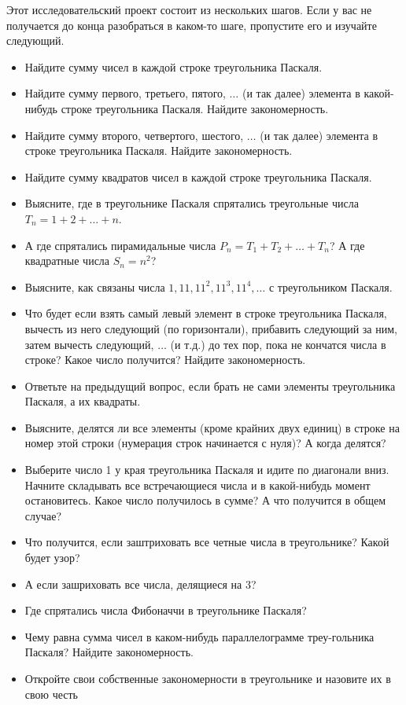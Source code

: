 ﻿

Этот исследовательский проект состоит из нескольких шагов. Если у вас не получается до конца разобраться в каком-то шаге, пропустите его и изучайте следующий.

\begin{itemize}
\item Найдите сумму чисел в каждой строке треугольника Паскаля.
\item Найдите сумму первого, третьего, пятого, $\ldots$ (и так далее) элемента в какой-нибудь строке треугольника Паскаля. Найдите закономерность.
\item Найдите сумму второго, четвертого, шестого, $\ldots$ (и так далее) элемента в строке треугольника Паскаля. Найдите закономерность.
\item Найдите сумму квадратов чисел в каждой строке треугольника Паскаля.
\item Выясните, где в треугольнике Паскаля спрятались треугольные числа $T_n = 1+2+\ldots + n$. 
\item А где спрятались пирамидальные числа $P_n = T_1 + T_2 + \ldots + T_n$? А где квадратные числа $S_n = n^2$?
\item Выясните, как связаны числа $1, 11, 11^2, 11^3, 11^4, \ldots$ с треугольником Паскаля.
\item Что будет если взять самый левый элемент в строке треугольника Паскаля, вычесть из него следующий (по горизонтали), прибавить следующий за ним, затем вычесть следующий, $\ldots$ (и т.д.) до тех пор, пока не кончатся числа в строке? Какое число получится? Найдите закономерность.
\item Ответьте на предыдущий вопрос, если брать не сами элементы треугольника Паскаля, а их квадраты.
\item Выясните, делятся ли все элементы (кроме крайних двух единиц) в строке на номер этой строки (нумерация строк начинается с нуля)? А когда делятся? 
\item Выберите число 1 у края треугольника Паскаля и идите по диагонали вниз. Начните складывать все встречающиеся числа и в какой-нибудь момент остановитесь. Какое число получилось в сумме? А что получится в общем случае?
\item Что получится, если заштриховать все четные числа в треугольнике? Какой будет узор?
\item А если зашриховать все числа, делящиеся на 3?
\item Где спрятались числа Фибоначчи в треугольнике Паскаля?
\item Чему равна сумма чисел в каком-нибудь параллелограмме треу-\linebreak гольника Паскаля? Найдите закономерность.
\item Откройте свои собственные закономерности в треугольнике и назовите их в свою честь
\end{itemize}
